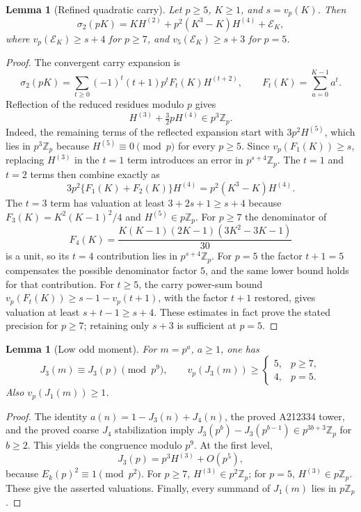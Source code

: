 \documentclass[11pt]{amsart}
\newtheorem{lemma}[theorem]{Lemma}
\theoremstyle{definition}
\theoremstyle{remark}
\begin{document}
\begin{lemma}[Refined quadratic carry]\label{lem:sharp-carry}
Let $p\ge5$, $K\ge1$, and $s=v_p(K)$. Then
\[
\sigma_2(pK)=KH^{(2)}+p^2(K^3-K)H^{(4)}+\mathcal E_K,
\]
where $v_p(\mathcal E_K)\ge s+4$ for $p\ge7$, and
$v_5(\mathcal E_K)\ge s+3$ for $p=5$.
\end{lemma}
\begin{proof}
The convergent carry expansion is
\[
\sigma_2(pK)=\sum_{t\ge0}(-1)^t(t+1)p^tF_t(K)H^{(t+2)},
\qquad F_t(K)=\sum_{a=0}^{K-1}a^t.
\]
Reflection of the reduced residues modulo $p$ gives
\[
H^{(3)}+\tfrac32pH^{(4)}\in p^3\mathbb Z_p.
\]
Indeed, the remaining terms of the reflected expansion start with
$3p^2H^{(5)}$, which lies in $p^3\mathbb Z_p$ because
$H^{(5)}\equiv0\pmod p$ for every $p\ge5$.
Since $v_p(F_1(K))\ge s$, replacing $H^{(3)}$ in the $t=1$ term
introduces an error in $p^{s+4}\mathbb Z_p$. The $t=1$ and $t=2$ terms
then combine exactly as
\[
3p^2\{F_1(K)+F_2(K)\}H^{(4)}
 =p^2(K^3-K)H^{(4)}.
\]
The $t=3$ term has valuation at least $3+2s+1\ge s+4$ because
$F_3(K)=K^2(K-1)^2/4$ and $H^{(5)}\in p\mathbb Z_p$.
For $p\ge7$ the denominator of
\[
F_4(K)=\frac{K(K-1)(2K-1)(3K^2-3K-1)}{30}
\]
is a unit, so its $t=4$ contribution lies in $p^{s+4}\mathbb Z_p$.
For $p=5$ the factor $t+1=5$ compensates the possible denominator
factor $5$, and the same lower bound holds for that contribution.
For $t\ge5$, the carry power-sum bound
$v_p(F_t(K))\ge s-1-v_p(t+1)$, with the factor $t+1$ restored,
gives valuation at least $s+t-1\ge s+4$.
These estimates in fact prove the stated precision for $p\ge7$;
retaining only $s+3$ is sufficient at $p=5$.
\end{proof}



\begin{lemma}[Low odd moment]\label{lem:low-J3}
For $m=p^a$, $a\ge1$, one has
\[
J_3(m)\equiv J_3(p)\pmod{p^9},\qquad
v_p(J_3(m))\ge
\begin{cases}5,&p\ge7,\\4,&p=5.\end{cases}
\]
Also $v_p(J_1(m))\ge1$.
\end{lemma}
\begin{proof}
The identity $a(n)=1-J_3(n)+J_4(n)$, the proved A212334 tower, and
the proved coarse $J_4$ stabilization imply
$J_3(p^b)-J_3(p^{b-1})\in p^{3b+3}\mathbb Z_p$ for $b\ge2$.
This yields the congruence modulo $p^9$.
At the first level,
\[
J_3(p)=p^3H^{(3)}+O(p^5),
\]
because $E_k(p)^2\equiv1\pmod{p^2}$.
For $p\ge7$, $H^{(3)}\in p^2\mathbb Z_p$; for $p=5$,
$H^{(3)}\in p\mathbb Z_p$. These give the asserted valuations.
Finally, every summand of $J_1(m)$ lies in $p\mathbb Z_p$.
\end{proof}
\end{document}
